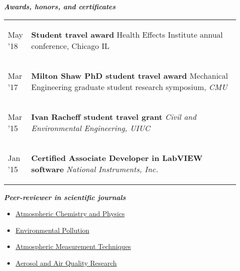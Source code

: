 \documentclass{article}
\begin{document}
\hrulefill
\textit{\textbf{  Awards, honors, and certificates  }}
\hrulefill
\vspace{-2.5mm}
\begin{center}
\begin{tabular}{p{0.07\linewidth} p{0.875\linewidth}}
\\[-2ex]
May '18 & \begin{flushleft}
\vspace{-6mm} \textbf{Student travel award}
\newline Health Effects Institute annual conference, Chicago IL
\end{flushleft}
\\[-2ex]
Mar '17 & \begin{flushleft}
\vspace{-6mm} \textbf{Milton Shaw PhD student travel award}
\newline Mechanical Engineering graduate student research symposium, \textit{CMU}
\end{flushleft}
\\[-2ex]
Mar '15 & \begin{flushleft}
\vspace{-6mm} \textbf{Ivan Racheff student travel grant}
\newline \textit{Civil and Environmental Engineering, UIUC}
\end{flushleft}
\\[-2ex]
Jan '15 & \begin{flushleft}
\vspace{-6mm} \textbf{Certified Associate Developer in LabVIEW software}
\newline \textit{National Instruments, Inc.}
\end{flushleft}
\\[-2ex]
\end{tabular}
\end{center}

\hrulefill
\textit{\textbf{  Peer-reviewer in scientific journals  }}
\hrulefill
\vspace{-3mm}
\begin{multicols}{2}
\begin{itemize}
\item \href{https://www.atmospheric-chemistry-and-physics.net/}{Atmospheric Chemistry and Physics}
\item \href{https://www.journals.elsevier.com/environmental-pollution}{Environmental Pollution}
\item \href{https://www.atmospheric-measurement-techniques.net/}{Atmospheric Measurement Techniques}
\item \href{http://www.aaqr.org/}{Aerosol and Air Quality Research}
\end{itemize}
\end{multicols}
\vspace{1mm}
\end{document}
